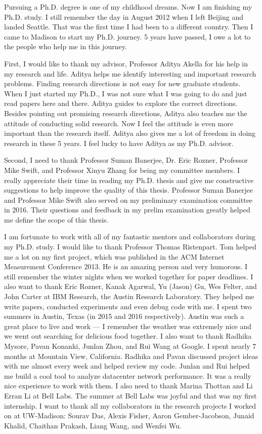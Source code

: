 

Pursuing a Ph.D. degree is one of my childhood dreams. 
Now I am finishing my Ph.D. study. I still remember the day in August 2012 when I left 
Beijing and landed Seattle. That was the first time I had been to 
a different country. Then I came to Madison to start my Ph.D. journey. 
5 years have passed, I owe a lot to the people who help me in this journey. 

First, I would like to thank my advisor, Professor Aditya Akella for 
his help in my research and life. Aditya helps me identify interesting and 
important research problems. Finding research directions is not easy for new 
graduate students. When I just started my Ph.D., I was not sure what I was going to do 
and just read papers here and there. Aditya guides to explore the correct directions. 
Besides pointing out promising research directions, Aditya also teaches me the 
attitude of conducting solid research. Now I feel the attitude is even more 
important than the research itself. Aditya also gives me a lot of freedom in doing 
research in these 5 years. I feel lucky to have Aditya as my Ph.D. advisor.

Second, I need to thank Professor Suman Banerjee, Dr. Eric Rozner, 
Professor Mike Swift, and Professor Xinyu Zhang for being my committee members. 
I really appreciate their time in reading my Ph.D. thesis and give me constructive 
suggestions to help improve the quality of this thesis. Professor Suman Banerjee 
and Professor Mike Swift also served on my preliminary examination committee in 2016. 
Their questions and feedback in my prelim examination greatly helped me 
define the scope of this thesis.

I am fortunate to work with all of my fantastic mentors and collaborators during my Ph.D. study. 
I would like to thank Professor Thomas Ristenpart. Tom helped me a lot on my first project, 
which was published in the ACM Internet Measurement Conference 2013. He is an amazing 
person and very humorous. I still remember the winter nights when we worked together for 
paper deadlines. 
I also want to thank Eric Rozner, Kanak Agarwal, Yu (Jason) Gu, Wes Felter, and 
John Carter at IBM Research, the Austin Research Laboratory. They helped me write papers, 
conducted experiments and even debug code with me. I spent two summers in Austin, Texas 
(in 2015 and 2016 respectively). Austin was such a great place to live and work --- I 
remember the weather was extremely nice and we went out searching for delicious food 
together. I also want to thank Radhika Mysore, Pavan Konanki, Junlan Zhou, and Rui Wang 
at Google. I spent nearly 7 months at Mountain View, California. Radhika and Pavan 
discussed project ideas with me almost every week and helped review my code. 
Junlan and Rui helped me build a cool tool to analyze datacenter network performance. 
It was a really nice experience to work with them. I also need to thank Marina 
Thottan and Li Erran Li at Bell Labs. The summer at Bell Labs was joyful and that 
was my first internship. I want to thank all my collaborators in the research projects 
I worked on at UW-Madison: Sourav Das, Alexis Fisher, Aaron Gember-Jacobson, 
Junaid Khalid, Chaithan Prakash, Liang Wang, and Wenfei Wu. 


